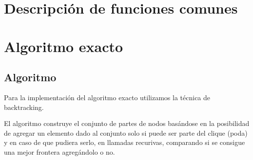\documentclass[a4paper, 10pt, twoside]{article}
\begin{document}


\newpage
\section{Descripción de funciones comunes}





\newpage

\section{Algoritmo exacto}
\subsection{Algoritmo}
Para la implementación del algoritmo exacto utilizamos la técnica de backtracking.

El algoritmo construye el conjunto de partes de nodos basándose en la posibilidad de agregar un elemento dado al conjunto solo si puede ser parte del clique (poda) y en caso de que pudiera serlo, en llamadas recurivas, comparando si se consigue una mejor frontera agregándolo o no.
\end{document}
